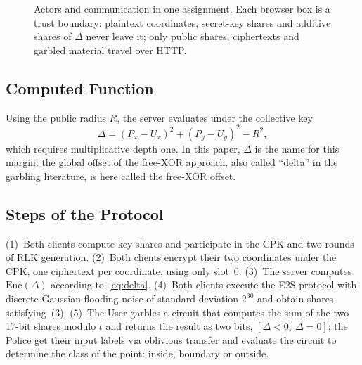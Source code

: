 \documentclass[conference,letterpaper]{IEEEtran}
\begin{document}
\begin{figure}[t]
\centering
{}
\caption{Actors and communication in one assignment. Each browser box is a trust boundary: plaintext coordinates, secret-key shares and additive shares of $\Delta$ never leave it; only public shares, ciphertexts and garbled material travel over HTTP.}
\label{fig:arch}
\end{figure}

\subsection{Computed Function}\label{sec:function}
Using the public radius $R$, the server evaluates under the collective key
\begin{equation}\label{eq:delta}
\Delta = (P_x - U_x)^2 + (P_y - U_y)^2 - R^2,
\end{equation}
which requires multiplicative depth one. In this paper, $\Delta$ is the name for this margin; the global offset of the free-XOR approach, also called ``delta'' in the garbling literature, is here called the free-XOR offset.

\subsection{Steps of the Protocol}
(1)~Both clients compute key shares and participate in the CPK and two rounds of RLK generation. (2)~Both clients encrypt their two coordinates under the CPK, one ciphertext per coordinate, using only slot~0. (3)~The server computes $\mathrm{Enc}(\Delta)$ according to~\eqref{eq:delta}. (4)~Both clients execute the E2S protocol with discrete Gaussian flooding noise of standard deviation $2^{30}$ and obtain shares satisfying~(3). (5)~The User garbles a circuit that computes the sum of the two 17-bit shares modulo $t$ and returns the result as two bits, $[\Delta < 0,\ \Delta = 0]$; the Police get their input labels via oblivious transfer and evaluate the circuit to determine the class of the point: inside, boundary or outside.
\end{document}
